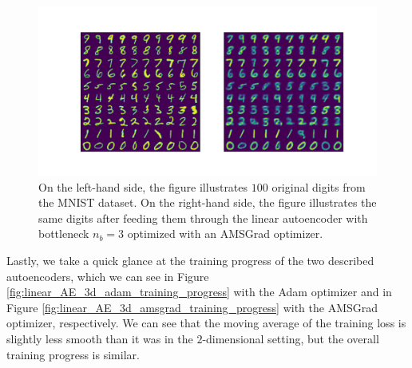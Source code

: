 \begin{figure}
\begin{center}
   \begin{minipage}[b]{\linewidth}
      \includegraphics[trim = 15mm 10mm 15mm 15mm, clip, width=\linewidth]{linear_AE_3d_amsgrad_inference}
	\end{minipage}
\end{center}
\caption{On the left-hand side, the figure illustrates $100$ original digits from the MNIST dataset. On the right-hand side, the figure illustrates the same digits after feeding them through the linear autoencoder with bottleneck $n_b=3$ optimized with an AMSGrad optimizer.}\label{fig:linear_AE_3d_amsgrad_inference}
\end{figure}

Lastly, we take a quick glance at the training progress of the two described autoencoders, which we can see in Figure \ref{fig:linear_AE_3d_adam_training_progress} with the Adam optimizer and in Figure \ref{fig:linear_AE_3d_amsgrad_training_progress} with the AMSGrad optimizer, respectively. We can see that the moving average of the training loss is slightly less smooth than it was in the $2$-dimensional setting, but the overall training progress is similar.

